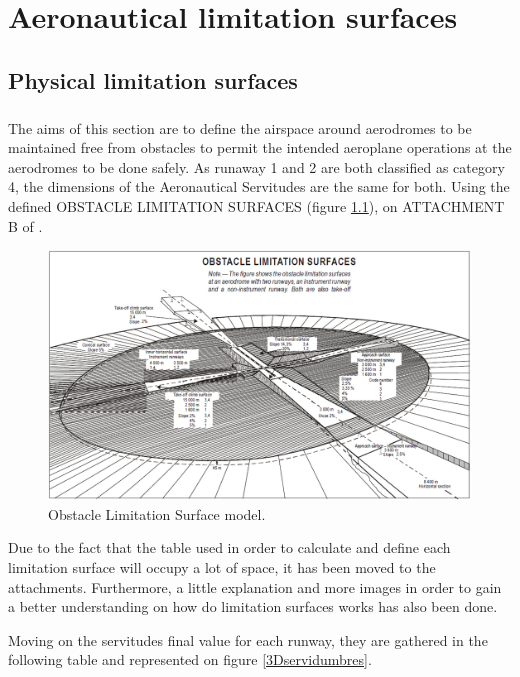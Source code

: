\chapter{Aeronautical limitation surfaces}

	\section{Physical limitation surfaces}
	\paragraph{}The aims of this section are to define the airspace around aerodromes to be	maintained free from obstacles to permit the intended aeroplane operations at the aerodromes to be done safely.
	As runaway 1 and 2 are both classified as category 4, the dimensions of the Aeronautical Servitudes are the same for both. Using the defined OBSTACLE LIMITATION SURFACES (figure \ref{servitudeMap}), on ATTACHMENT B of \cite{Standards2016}.
	
	\begin{figure}[H]
		\centering
		\includegraphics[clip, trim=0cm 0cm 0cm 0cm, width=\textwidth]{./images/servidumbres/servitudeMap}
		\caption{Obstacle Limitation Surface model.}
		\label{servitudeMap}
	\end{figure}

	Due to the fact that the table used in order to calculate and define each limitation surface will occupy a lot of space, it has been moved to the attachments. Furthermore, a little explanation and more images in order to gain a better understanding on how do limitation surfaces works has also been done. 
	
	Moving on the servitudes final value for each runway, they are gathered in the following table and represented on figure \ref{3Dservidumbres}.
	
